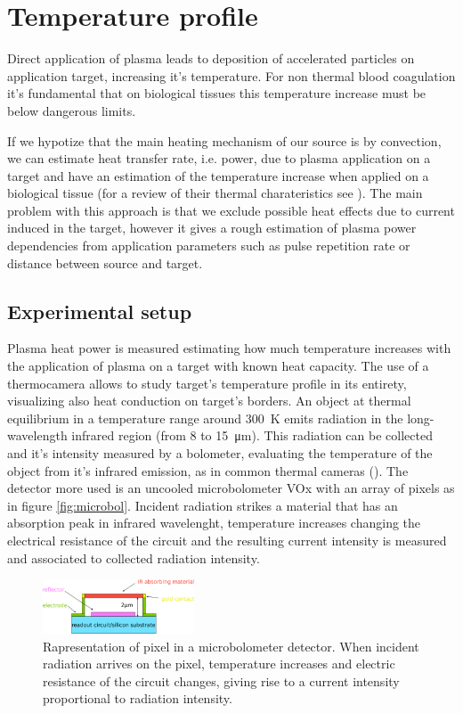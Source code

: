 \chapter{Temperature profile}
\label{ch:temperature}
Direct application of plasma leads to deposition of accelerated particles on application target, increasing it's temperature. For non thermal blood coagulation it's fundamental that on biological tissues this temperature increase must be below dangerous limits.

If we hypotize that the main heating mechanism of our source is by convection, we can estimate heat transfer rate, i.e. power, due to plasma application on a target and have an estimation of the temperature increase when applied on a biological tissue (for a review of their thermal charateristics see \cite{biotissues}). The main problem with this approach is that we exclude possible heat effects due to current induced in the target, however it gives a rough estimation of plasma power dependencies from application parameters such as pulse repetition rate or distance between source and target.

\section{Experimental setup}
Plasma heat power is measured estimating how much temperature increases with the application of plasma on a target with known heat capacity. The use of a thermocamera allows to study target's temperature profile in its entirety, visualizing also heat conduction on target's borders.
An object at thermal equilibrium in a temperature range around \SI{300}{\kelvin} emits radiation in the long-wavelength infrared region (from \num{8} to \SI{15}{\micro\meter}). This radiation can be collected and it's intensity measured by a bolometer, evaluating the temperature of the object from it's infrared emission, as in common thermal cameras (\cite{Gade2014}). The detector more used is an uncooled microbolometer VOx with an array of pixels as in figure \ref{fig:microbol}. Incident radiation strikes a material that has an absorption peak in infrared wavelenght, temperature increases changing the electrical resistance of the circuit and the resulting current intensity is measured and associated to collected radiation intensity.
\begin{figure}
 \centering
 \includegraphics[width=0.4\textwidth]{Images/Temperature/Microbolometer.png}
 \caption{Rapresentation of pixel in a microbolometer detector. When incident radiation arrives on the pixel, temperature increases and electric resistance of the circuit changes, giving rise to a current intensity proportional to radiation intensity.}
\end{figure}


